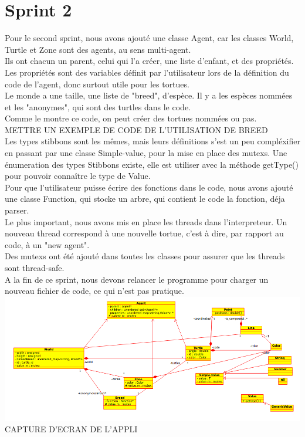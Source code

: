 \section{Sprint 2}
Pour le second sprint, nous avons ajouté une classe Agent, car les classes World, Turtle et Zone sont des agents, au sens multi-agent.\\ Ils ont chacun un parent, celui qui l'a créer, une liste d'enfant, et des propriétés. Les propriétés sont des variables définit par l'utilisateur lors de la définition du code de l'agent, donc surtout utile pour les tortues.\\
Le monde a une taille, une liste de "breed", d'espèce. Il y a les espèces nommées et les "anonymes", qui sont des turtles dans le code.\\
Comme le montre ce code, on peut créer des tortues nommées ou pas.\\
METTRE UN EXEMPLE DE CODE DE L'UTILISATION DE BREED\\

Les types stibbons sont les mêmes, mais leurs définitions s'est un peu compléxifier en passant par une classe Simple-value, pour la mise en place des mutexs. Une énumeration des types Stibbons existe, elle est utiliser avec la méthode getType() pour pouvoir connaître le type de Value.\\
Pour que l'utilisateur puisse écrire des fonctions dans le code, nous avons ajouté une classe Function, qui stocke un arbre, qui contient le code la fonction, déja parser.\\
Le plus important, nous avons mis en place les threads dans l'interpreteur. Un nouveau thread correspond à une nouvelle tortue, c'est à dire, par rapport au code, à un "new agent".\\ Des mutexs ont été ajouté dans toutes les classes pour assurer que les threads sont thread-safe.\\
A la fin de ce sprint, nous devons relancer le programme pour charger un nouveau fichier de code, ce qui n'est pas pratique.\\
\includegraphics[scale=0.45]{doc/report/uml/v02reel.png}
CAPTURE D'ECRAN DE L'APPLI
\newpage


